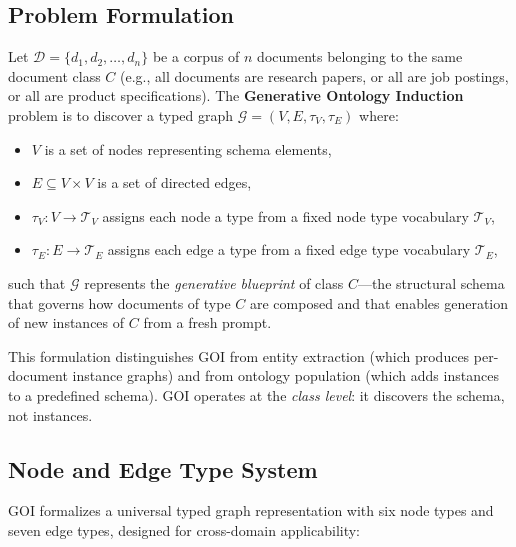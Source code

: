 \documentclass[runningheads,a4paper]{llncs}
\begin{document}
\subsection{Problem Formulation}

Let $\mathcal{D} = \{d_1, d_2, \ldots, d_n\}$ be a corpus of $n$
documents belonging to the same document class $C$ (e.g., all documents
are research papers, or all are job postings, or all are product
specifications). The \textbf{Generative Ontology Induction} problem is
to discover a typed graph $\mathcal{G} = (V, E, \tau_V, \tau_E)$ where:
\begin{itemize}
  \item $V$ is a set of nodes representing schema elements,
  \item $E \subseteq V \times V$ is a set of directed edges,
  \item $\tau_V : V \rightarrow \mathcal{T}_V$ assigns each node a type
    from a fixed node type vocabulary $\mathcal{T}_V$,
  \item $\tau_E : E \rightarrow \mathcal{T}_E$ assigns each edge a type
    from a fixed edge type vocabulary $\mathcal{T}_E$,
\end{itemize}
such that $\mathcal{G}$ represents the \emph{generative blueprint} of
class $C$---the structural schema that governs how documents of type $C$
are composed and that enables generation of new instances of $C$ from a
fresh prompt.

This formulation distinguishes GOI from entity extraction (which
produces per-document instance graphs) and from ontology population
(which adds instances to a predefined schema). GOI operates at the
\emph{class level}: it discovers the schema, not instances.

\subsection{Node and Edge Type System}

GOI formalizes a universal typed graph representation with six node
types and seven edge types, designed for cross-domain applicability:
\end{document}
